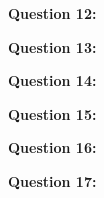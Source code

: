 \documentclass{report}
\begin{document}
    \bigbreak \noindent \bigbreak \noindent 
    \begin{Large}
        \textbf{Question 12:}
    \end{Large}
    \bigbreak \noindent 
    \bigbreak \noindent 

    \bigbreak \noindent \bigbreak \noindent 
    \begin{Large}
        \textbf{Question 13:}
    \end{Large}
    \bigbreak \noindent 
    \bigbreak \noindent 

    \bigbreak \noindent \bigbreak \noindent 
    \begin{Large}
        \textbf{Question 14:}
    \end{Large}
    \bigbreak \noindent 
    \bigbreak \noindent 

    \bigbreak \noindent \bigbreak \noindent 
    \begin{Large}
        \textbf{Question 15:}
    \end{Large}
    \bigbreak \noindent 
    \bigbreak \noindent 

    \bigbreak \noindent \bigbreak \noindent 
    \begin{Large}
        \textbf{Question 16:}
    \end{Large}
    \bigbreak \noindent 
    \bigbreak \noindent 

    \bigbreak \noindent \bigbreak \noindent 
    \begin{Large}
        \textbf{Question 17:}
    \end{Large}
    \bigbreak \noindent 
    \bigbreak \noindent 
    
\end{document}
